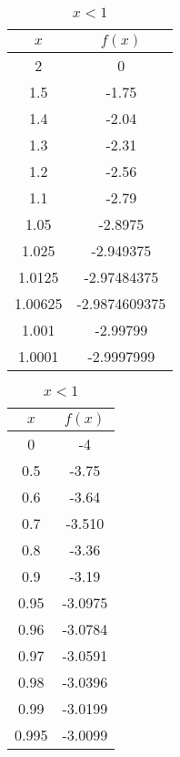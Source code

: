 \documentclass[a4paper, 12pt]{report}
\begin{document}
	\begin{table}[h]
	\begin{minipage}{.5\textwidth}	
	\centering
	\caption{$x>1$}
	\begin{tabular}{| c | c |}
		\hline 
		$x$ & $f(x)$ \\ 
		\hline 
		2 & 0 \\ 
		\hline 
		1.5 & -1.75 \\ 
		\hline 
		1.4 & -2.04 \\ 
		\hline 
		1.3 & -2.31 \\ 
		\hline 
		1.2 & -2.56 \\ 
		\hline 
		1.1 & -2.79 \\ 
		\hline 
		1.05 & -2.8975 \\ 
		\hline 
		1.025 &	-2.949375\\
		\hline
		1.0125 & -2.97484375\\
		\hline
		1.00625 & -2.9874609375	\\
		\hline 
		1.001	& -2.99799	\\
		\hline
		1.0001	& -2.9997999	\\
		\hline
	\end{tabular} 
	\end{minipage}
	\begin{minipage}{.5\textwidth}
	\centering
	\caption{$x<1$}
	\begin{tabular}{| c | c |}
		\hline 
		$x$ & $f(x)$ \\ 
		\hline 
		0 & -4 \\ 
		\hline 
		0.5 & -3.75 \\ 
		\hline 
		0.6 & -3.64 \\ 
		\hline 
		0.7 & -3.510 \\ 
		\hline 
		0.8 & -3.36 \\ 
		\hline 
		0.9 & -3.19 \\ 
		\hline 
		0.95 & -3.0975 \\ 
		\hline 
		0.96 & -3.0784 \\ 
		\hline 
		0.97 & -3.0591 \\ 
		\hline 
		0.98 & -3.0396 \\ 
		\hline 
		0.99 & -3.0199 \\ 
		\hline 
		0.995 & -3.0099 \\ 
		\hline 
	\end{tabular} 
	\end{minipage}
	\end{table}	

	
\end{document}
